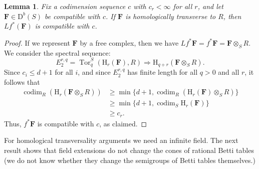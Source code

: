 \documentclass[12pt]{amsart}
\newtheorem{lemma}{Lemma}[section]
\theoremstyle{definition}
\theoremstyle{remark}
\newcommand{\Tor}{\operatorname{Tor}}
\newcommand{\codim}{\operatorname{codim}}
\newcommand{\HH}{\mathrm{H}}
\newcommand{\cc}{c}
\newcommand{\FF}{\mathbf{F}}
\newcommand{\DD}{\mathrm{D}}
\begin{document}
 \begin{lemma}\label{lem:pushpull}
Fix a codimension sequence $\cc$ with $c_r<\infty$ for all $r$, and let $\FF\in \DD^b(S)$ be compatible with $\cc$.  If $\FF$ is homologically transverse to $R$, then $Lf^*(\FF)$ is compatible with $\cc$.
\end{lemma}
\begin{proof}
If we represent $\FF$ by a free complex, then we have $Lf^*\FF=f^*\FF=\FF\otimes_S R$.   We consider the spectral sequence:
\[
E^{r,q}_2=\Tor^S_{q}(\HH_r(\FF),R)\Rightarrow \HH_{q+r}(\FF\otimes_S R).
\]
Since $c_i\leq d+1$ for all $i$, and since $E^{r,q}_2$ has finite length for all $q>0$ and all $r$, it follows that
\begin{align*}
\codim_R \left(\HH_{r}(\FF\otimes_S R)\right) &\geq \min\{d+1, \codim_R\left( \HH_r(\FF)\otimes_S R\right)\} \\
&\geq \min\{d+1, \codim_S \HH_r(\FF)\}\\
& \geq c_r.
\end{align*}
Thus, $f^*\FF$ is compatible with $\cc$, as claimed.
\end{proof}

For homological transversality arguments we need an infinite field. The next result shows that
field extensions do not change the cones of rational Betti tables (we do not know whether they change the semigroups of Betti tables themselves.)
\end{document}
